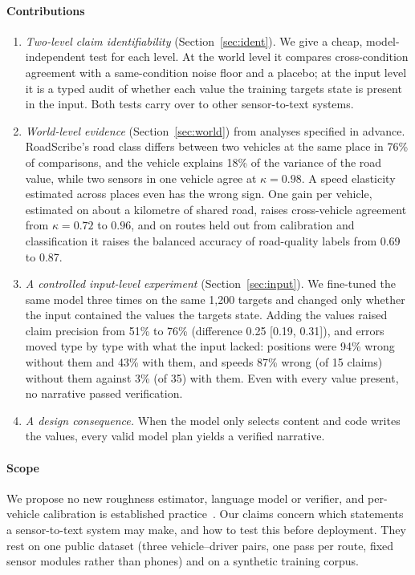 \paragraph*{Contributions}
\begin{enumerate}
\item \emph{Two-level claim identifiability} (Section~\ref{sec:ident}). We give a cheap, model-independent test for each level. At the world level it compares cross-condition agreement with a same-condition noise floor and a placebo; at the input level it is a typed audit of whether each value the training targets state is present in the input. Both tests carry over to other sensor-to-text systems.
\item \emph{World-level evidence} (Section~\ref{sec:world}) from analyses specified in advance. RoadScribe's road class differs between two vehicles at the same place in 76\% of comparisons, and the vehicle explains 18\% of the variance of the road value, while two sensors in one vehicle agree at $\kappa=0.98$. A speed elasticity estimated across places even has the wrong sign. One gain per vehicle, estimated on about a kilometre of shared road, raises cross-vehicle agreement from $\kappa=0.72$ to $0.96$, and on routes held out from calibration and classification it raises the balanced accuracy of road-quality labels from 0.69 to 0.87.
\item \emph{A controlled input-level experiment} (Section~\ref{sec:input}). We fine-tuned the same model three times on the same 1{,}200 targets and changed only whether the input contained the values the targets state. Adding the values raised claim precision from 51\% to 76\% (difference 0.25 [0.19, 0.31]), and errors moved type by type with what the input lacked: positions were 94\% wrong without them and 43\% with them, and speeds 87\% wrong (of 15 claims) without them against 3\% (of 35) with them. Even with every value present, no narrative passed verification.
\item \emph{A design consequence.} When the model only selects content and code writes the values, every valid model plan yields a verified narrative.
\end{enumerate}

\paragraph*{Scope}
We propose no new roughness estimator, language model or verifier, and per-vehicle calibration is established practice~\cite{sayers1986iri}.
Our claims concern which statements a sensor-to-text system may make, and how to test this before deployment.
They rest on one public dataset (three vehicle--driver pairs, one pass per route, fixed sensor modules rather than phones) and on a synthetic training corpus.
